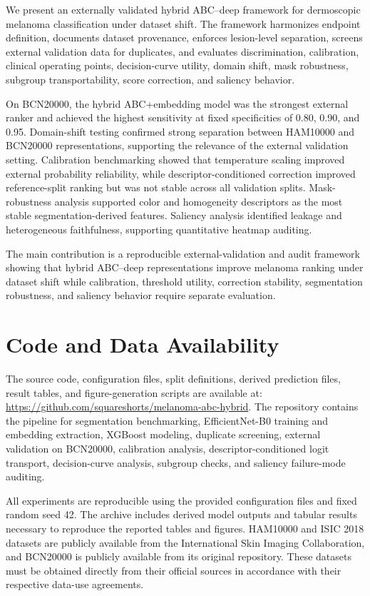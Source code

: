\documentclass[preprint,12pt]{elsarticle}
\begin{document}

We present an externally validated hybrid ABC--deep framework for dermoscopic melanoma classification under dataset shift. The framework harmonizes endpoint definition, documents dataset provenance, enforces lesion-level separation, screens external validation data for duplicates, and evaluates discrimination, calibration, clinical operating points, decision-curve utility, domain shift, mask robustness, subgroup transportability, score correction, and saliency behavior.

On BCN20000, the hybrid ABC+embedding model was the strongest external ranker and achieved the highest sensitivity at fixed specificities of 0.80, 0.90, and 0.95. Domain-shift testing confirmed strong separation between HAM10000 and BCN20000 representations, supporting the relevance of the external validation setting. Calibration benchmarking showed that temperature scaling improved external probability reliability, while descriptor-conditioned correction improved reference-split ranking but was not stable across all validation splits. Mask-robustness analysis supported color and homogeneity descriptors as the most stable segmentation-derived features. Saliency analysis identified leakage and heterogeneous faithfulness, supporting quantitative heatmap auditing.

The main contribution is a reproducible external-validation and audit framework showing that hybrid ABC--deep representations improve melanoma ranking under dataset shift while calibration, threshold utility, correction stability, segmentation robustness, and saliency behavior require separate evaluation.

\section*{Code and Data Availability}

The source code, configuration files, split definitions, derived prediction files, result tables, and figure-generation scripts are available at: \url{https://github.com/squareshorts/melanoma-abc-hybrid}. The repository contains the pipeline for segmentation benchmarking, EfficientNet-B0 training and embedding extraction, XGBoost modeling, duplicate screening, external validation on BCN20000, calibration analysis, descriptor-conditioned logit transport, decision-curve analysis, subgroup checks, and saliency failure-mode auditing.

All experiments are reproducible using the provided configuration files and fixed random seed 42. The archive includes derived model outputs and tabular results necessary to reproduce the reported tables and figures. HAM10000 and ISIC 2018 datasets are publicly available from the International Skin Imaging Collaboration, and BCN20000 is publicly available from its original repository. These datasets must be obtained directly from their official sources in accordance with their respective data-use agreements.
\end{document}
